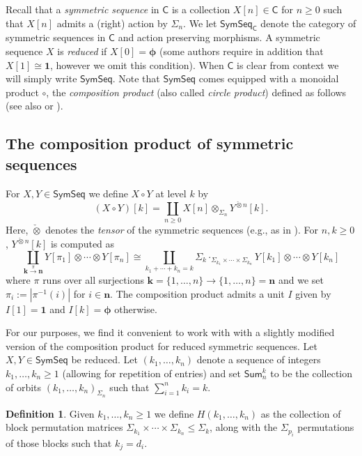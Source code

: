 \documentclass[11pt]{amsart}
\theoremstyle{definition}
\newtheorem{definition}[subsection]{Definition}
\theoremstyle{remark}
\newcommand{\SymSeq}{\mathsf{SymSeq}}
\newcommand{\ptC}{\pmb{\phi}}
\begin{document}
Recall that a \textit{symmetric sequence} in $\mathsf{C}$ is a collection $X[n]\in\mathsf{C}$ for $n\geq 0$ such that $X[n]$ admits a (right) action by $\Sigma_n$. We let $\SymSeq_{\mathsf{C}}$ denote the category of symmetric sequences in $\mathsf{C}$ and action preserving morphisms. A symmetric sequence $X$ is \textit{reduced} if $X[0]=\ptC$ (some authors require in addition that $X[1]\cong \mathbf{1}$, however we omit this condition). When $\mathsf{C}$ is clear from context we will simply write $\SymSeq$.
Note that $\SymSeq$ comes equipped with a monoidal product $\circ$, the \textit{composition product} (also called \textit{circle product}) defined as follows (see also \cite{Rezk-thesis} or \cite{Har-1}). 

\subsection{The composition product of symmetric sequences} For $X,Y\in \SymSeq$ we define $X\circ Y$ at level $k$ by \begin{equation}
    (X {\circ} Y)[k] = \coprod_{n\geq 0} X[n] \otimes_{\Sigma_n} Y^{\check{\otimes} n} [k].
\end{equation}
Here, $\check{\otimes}$ denotes the \textit{tensor} of the symmetric sequences (e.g., as in \cite{Har-1}). For $n,k\geq 0$, $Y^{\check{\otimes} n}[k]$ is computed as \[ \coprod_{\mathbf{k}\xrightarrow{\pi} \mathbf{n}} Y[\pi_1] {\otimes} \cdots {\otimes} Y[\pi_n] \cong \coprod_{k_1+\cdots+k_n=k} \Sigma_k \cdot_{\Sigma_{k_1} \times\cdots\times \Sigma_{k_n}} Y[k_1] {\otimes} \cdots {\otimes} Y[k_n] \]
where $\pi$ runs over all surjections $\mathbf{k}=\{1,\dots,n\}\to \{1,\dots,n\}=\mathbf{n}$ and we set $\pi_i:=|\pi^{-1}(i)|$ for $i\in \mathbf{n}$. The composition product admits a unit $I$ given by $I[1]=\mathbf{1}$ and $I[k]=\ptC$ otherwise.

For our purposes, we find it convenient to work with with a slightly modified version of the composition product for reduced symmetric sequences. Let $X,Y\in \SymSeq$ be reduced. Let $(k_1,\dots,k_n)$ denote a sequence of integers $k_1,\dots,k_n\geq 1$ (allowing for repetition of entries) and set $\mathsf{Sum}_n^k$ to be the collection of orbits $(k_1,\dots,k_n)_{\Sigma_n}$ such that $\sum_{i=1}^n k_i=k$. 

\begin{definition}\label{def:H} Given $k_1,\dots,k_n\geq 1$ we define $H(k_1,\dots,k_n)$ as the collection of block permutation matrices $\Sigma_{k_1}\times \cdots \times \Sigma_{k_n}\leq \Sigma_k$, along with the $\Sigma_{p_i}$ permutations of those blocks such that $k_j=d_i$. 
\end{definition}
\end{document}
